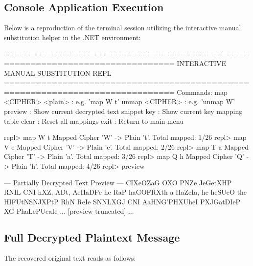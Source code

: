 \documentclass[12pt,a4paper]{article}
\begin{document}
\subsection{Console Application Execution}
Below is a reproduction of the terminal session utilizing the interactive manual substitution helper in the .NET environment:

\begin{terminalwindow}
==============================================================================
  INTERACTIVE MANUAL SUBSTITUTION REPL
==============================================================================
Commands:
  map <CIPHER> <plain>   : e.g. 'map W t'
  unmap <CIPHER>         : e.g. 'unmap W'
  preview                : Show current decrypted text snippet
  key                    : Show current key mapping table
  clear                  : Reset all mappings
  exit                   : Return to main menu

repl> map W t
Mapped Cipher 'W' -> Plain 't'. Total mapped: 1/26
repl> map V e
Mapped Cipher 'V' -> Plain 'e'. Total mapped: 2/26
repl> map T a
Mapped Cipher 'T' -> Plain 'a'. Total mapped: 3/26
repl> map Q h
Mapped Cipher 'Q' -> Plain 'h'. Total mapped: 4/26
repl> preview

--- Partially Decrypted Text Preview ---
CIXeOZaG OXO PNZe JeGetXHP RNIL CNI hXZ, ADt, AeHaDPe he RaP haGOFRXth a HaZeIa,
he heSUeO the HIFUtNSNJXPtP RhN ReIe SNNLXGJ CNI AaHNG'PHXUheI PXJGatDIeP XG PhaLePUeaIe
... [preview truncated] ...
\end{terminalwindow}

\subsection{Full Decrypted Plaintext Message}
The recovered original text reads as follows:
\end{document}
